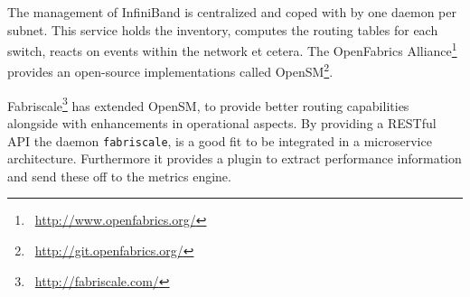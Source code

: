 The management of InfiniBand is centralized and coped with by one daemon per subnet. This service holds the inventory,
computes the routing tables for each switch, reacts on events within the network et cetera.
The OpenFabrics Alliance\footnote{\Mundus~\url{http://www.openfabrics.org/}} provides an open-source implementations called OpenSM\footnote{\Mundus~\url{http://git.openfabrics.org/}}.


Fabriscale\footnote{\Mundus~\url{http://fabriscale.com/}} has extended OpenSM,
to provide better routing capabilities alongside with enhancements in operational aspects.
By providing a RESTful API the daemon \texttt{fabriscale}, is a good fit to be integrated in
a microservice architecture. Furthermore it provides a plugin to extract performance information and send these off to the metrics engine.
